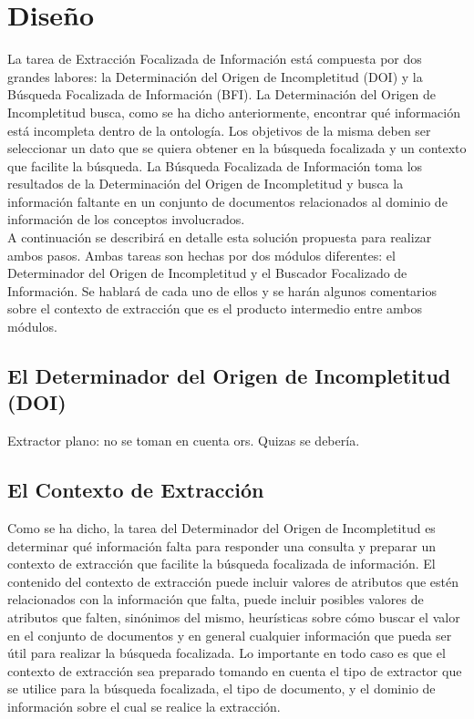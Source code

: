 \chapter{Diseño} \label{chap:diseno}

La tarea de Extracción Focalizada de Información está compuesta por dos grandes labores: la Determinación del Origen de Incompletitud (DOI) y la Búsqueda Focalizada de Información (BFI). La Determinación del Origen de Incompletitud busca, como se ha dicho anteriormente, encontrar qué información está incompleta dentro de la ontología. Los objetivos de la misma deben ser seleccionar un dato que se quiera obtener en la búsqueda focalizada y un contexto que facilite la búsqueda.  La Búsqueda Focalizada de Información toma los resultados de la Determinación del Origen de Incompletitud y busca la información faltante en un conjunto de documentos relacionados al dominio de información de los conceptos involucrados. \\

A continuación se describirá en detalle esta solución propuesta para realizar ambos pasos. Ambas tareas son hechas por dos módulos diferentes: el Determinador del Origen de Incompletitud y el Buscador Focalizado de Información. Se hablará de cada uno de ellos y se harán algunos comentarios sobre el contexto de extracción que es el producto intermedio entre ambos módulos. 

\section{El Determinador del Origen de Incompletitud (DOI)}\label{sect:diseno-DOI}

Extractor plano: no se toman en cuenta ors. Quizas se debería.

\section{El Contexto de Extracción}\label{sect:diseno-extCont}

Como se ha dicho, la tarea del Determinador del Origen de Incompletitud es determinar qué información falta para responder una consulta y preparar un contexto de extracción que facilite la búsqueda focalizada de información. El contenido del contexto de extracción puede incluir valores de atributos que estén relacionados con la información que falta, puede incluir posibles valores de atributos que falten, sinónimos del mismo, heurísticas sobre cómo buscar el valor en el conjunto de documentos y en general cualquier información que pueda ser útil para realizar la búsqueda focalizada. Lo importante en todo caso es que el contexto de extracción sea preparado tomando en cuenta el tipo de extractor que se utilice para la búsqueda focalizada, el tipo de documento, y el dominio de información sobre el cual se realice la extracción.\\

